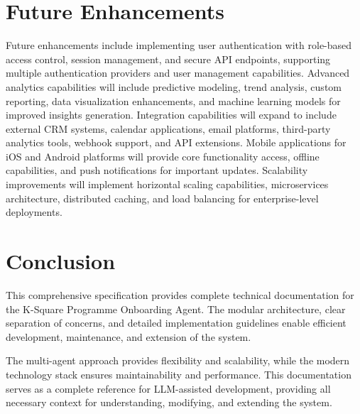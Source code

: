 \documentclass{article}
\begin{document}
\section{Future Enhancements}
Future enhancements include implementing user authentication with role-based access control, session management, and secure API endpoints, supporting multiple authentication providers and user management capabilities. Advanced analytics capabilities will include predictive modeling, trend analysis, custom reporting, data visualization enhancements, and machine learning models for improved insights generation. Integration capabilities will expand to include external CRM systems, calendar applications, email platforms, third-party analytics tools, webhook support, and API extensions. Mobile applications for iOS and Android platforms will provide core functionality access, offline capabilities, and push notifications for important updates. Scalability improvements will implement horizontal scaling capabilities, microservices architecture, distributed caching, and load balancing for enterprise-level deployments.

\section{Conclusion}
This comprehensive specification provides complete technical documentation for the K-Square Programme Onboarding Agent. The modular architecture, clear separation of concerns, and detailed implementation guidelines enable efficient development, maintenance, and extension of the system.

The multi-agent approach provides flexibility and scalability, while the modern technology stack ensures maintainability and performance. This documentation serves as a complete reference for LLM-assisted development, providing all necessary context for understanding, modifying, and extending the system.
\end{document}
